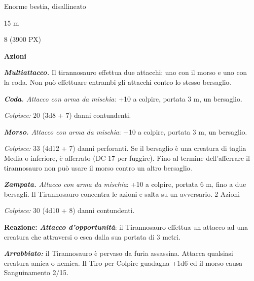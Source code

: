 \begin{multicols}{2}
{
\begin{description}[noitemsep, topsep=0pt, parsep=0pt, partopsep=0pt, itemsep=1pt, leftmargin=2.35cm,  labelwidth=2.2cm, itemindent=0cm, listparindent=0pt] %
\setlength{\baselineskip}{10pt}
\item[\textbf{Taglia/Tipo}] Enorme bestia, disallineato
\item[\textbf{Caratt.}] 
\item[\textbf{Punti Ferita}] 
\item[\textbf{Movimento}] 15 m
\item[\textbf{Tiri Salvez.}] 
\item[\textbf{Sfida}] 8 (3900 PX)
\end{description}
\smallskip

\textbf{Azioni}

\emph{\textbf{Multiattacco.}} Il tirannosauro effettua due attacchi: uno con il morso e uno con la coda. Non può effettuare entrambi gli attacchi contro lo stesso bersaglio.

\emph{\textbf{Coda.} Attacco con arma da mischia}: +10 a colpire, portata 3 m, un bersaglio.

\emph{Colpisce:} 20 (3d8 + 7) danni contundenti.

\emph{\textbf{Morso.} Attacco con arma da mischia}: +10 a colpire, portata 3 m, un bersaglio.

\emph{Colpisce:} 33 (4d12 + 7) danni perforanti. Se il bersaglio è una creatura di taglia Media o inferiore, è afferrato (DC 17 per fuggire). Fino al termine dell'afferrare il tirannosauro non può usare il morso contro un altro bersaglio.

\emph{\textbf{Zampata.} Attacco con arma da mischia}: +10 a colpire, portata 6 m, fino a due bersagli. Il Tirannosauro concentra le azioni e salta su un avversario. 2 Azioni

\emph{Colpisce:} 30 (4d10 + 8) danni contundenti.

\textbf{Reazione: \emph{Attacco d'opportunità}}: il Tirannosauro effettua un attacco ad una creatura che attraversi o esca dalla sua portata di 3 metri.

\emph{\textbf{Arrabbiato:}} il Tirannosauro è pervaso da furia assassina. Attacca qualsiasi creatura amica o nemica. Il Tiro per Colpire guadagna +1d6 ed il morso causa Sanguinamento 2/15.

}
\end{multicols}
